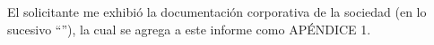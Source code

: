El solicitante me exhibi\'o la documentaci\'on corporativa de la sociedad \textcolor{principal}{\empresaSolicitante} (en lo sucesivo \textcolor{principal}{``\empresaCorto''}), la cual se agrega a este informe como \textcolor{secundario}{AP\'ENDICE 1}.